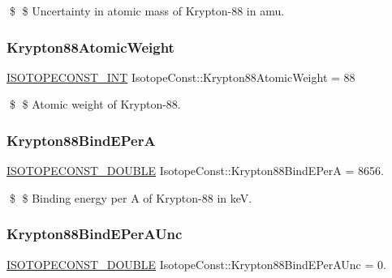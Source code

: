 \$ \$ Uncertainty in atomic mass of Krypton-\/88 in amu. \mbox{\label{group___isotope_const-_krypton-_kr88_ga9b362cde3c2db509a79770d1d6788e5c}} 
\subsubsection{\texorpdfstring{Krypton88\+Atomic\+Weight}{Krypton88AtomicWeight}}
{\footnotesize\ttfamily \mbox{\hyperlink{group___isotope_const-_macros_ga5f18360b3e99483a35c32d789e62621c}{I\+S\+O\+T\+O\+P\+E\+C\+O\+N\+S\+T\+\_\+\+I\+NT}} Isotope\+Const\+::\+Krypton88\+Atomic\+Weight = 88}

\$ \$ Atomic weight of Krypton-\/88. \mbox{\label{group___isotope_const-_krypton-_kr88_ga3803bdabf7ad2c5a1e7f3c3af3226f01}} 
\subsubsection{\texorpdfstring{Krypton88\+Bind\+E\+PerA}{Krypton88BindEPerA}}
{\footnotesize\ttfamily \mbox{\hyperlink{group___isotope_const-_macros_ga8f45a7272ce02c0b4c65c44636ed719a}{I\+S\+O\+T\+O\+P\+E\+C\+O\+N\+S\+T\+\_\+\+D\+O\+U\+B\+LE}} Isotope\+Const\+::\+Krypton88\+Bind\+E\+PerA = 8656.}

\$ \$ Binding energy per A of Krypton-\/88 in keV. \mbox{\label{group___isotope_const-_krypton-_kr88_ga1bfb9a761c2e32b8c0bd72639a4b30a3}} 
\subsubsection{\texorpdfstring{Krypton88\+Bind\+E\+Per\+A\+Unc}{Krypton88BindEPerAUnc}}
{\footnotesize\ttfamily \mbox{\hyperlink{group___isotope_const-_macros_ga8f45a7272ce02c0b4c65c44636ed719a}{I\+S\+O\+T\+O\+P\+E\+C\+O\+N\+S\+T\+\_\+\+D\+O\+U\+B\+LE}} Isotope\+Const\+::\+Krypton88\+Bind\+E\+Per\+A\+Unc = 0.}

